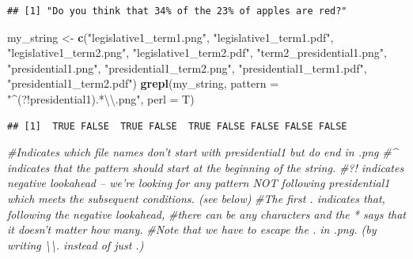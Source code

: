 \documentclass[]{book}
\newenvironment{Shaded}{\begin{snugshade}}{\end{snugshade}}
\newcommand{\KeywordTok}[1]{\textcolor[rgb]{0.13,0.29,0.53}{\textbf{#1}}}
\newcommand{\DataTypeTok}[1]{\textcolor[rgb]{0.13,0.29,0.53}{#1}}
\newcommand{\CharTok}[1]{\textcolor[rgb]{0.31,0.60,0.02}{#1}}
\newcommand{\StringTok}[1]{\textcolor[rgb]{0.31,0.60,0.02}{#1}}
\newcommand{\CommentTok}[1]{\textcolor[rgb]{0.56,0.35,0.01}{\textit{#1}}}
\newcommand{\NormalTok}[1]{#1}
\theoremstyle{definition}
\theoremstyle{definition}
\theoremstyle{definition}
\theoremstyle{remark}
\begin{document}
\begin{Shaded}
\end{Shaded}

\begin{verbatim}
## [1] "Do you think that 34% of the 23% of apples are red?"
\end{verbatim}

\begin{Shaded}
\begin{Highlighting}[]
\NormalTok{my_string <-}\StringTok{ }\KeywordTok{c}\NormalTok{(}\StringTok{"legislative1_term1.png"}\NormalTok{, }\StringTok{"legislative1_term1.pdf"}\NormalTok{,}
               \StringTok{"legislative1_term2.png"}\NormalTok{, }\StringTok{"legislative1_term2.pdf"}\NormalTok{,}
               \StringTok{"term2_presidential1.png"}\NormalTok{, }
               \StringTok{"presidential1.png"}\NormalTok{, }\StringTok{"presidential1_term2.png"}\NormalTok{,}
               \StringTok{"presidential1_term1.pdf"}\NormalTok{, }\StringTok{"presidential1_term2.pdf"}\NormalTok{)}
\KeywordTok{grepl}\NormalTok{(my_string, }\DataTypeTok{pattern =} \StringTok{"^(?!presidential1).*}\CharTok{\textbackslash{}\textbackslash{}}\StringTok{.png"}\NormalTok{, }\DataTypeTok{perl =}\NormalTok{ T)}
\end{Highlighting}
\end{Shaded}

\begin{verbatim}
## [1]  TRUE FALSE  TRUE FALSE  TRUE FALSE FALSE FALSE FALSE
\end{verbatim}

\begin{Shaded}
\begin{Highlighting}[]
\CommentTok{#Indicates which file names don't start with presidential1 but do end in .png}
\CommentTok{#^ indicates that the pattern should start at the beginning of the string. }
\CommentTok{#?! indicates negative lookahead -- we're looking for any pattern NOT following presidential1 which meets the subsequent conditions. (see below)}
\CommentTok{#The first . indicates that, following the negative lookahead, }
\CommentTok{#there can be any characters and the * says that it doesn't matter how many. }
\CommentTok{#Note that we have to escape the . in .png. (by writing \textbackslash{}\textbackslash{}. instead of just .)}
\end{Highlighting}
\end{Shaded}
\end{document}
